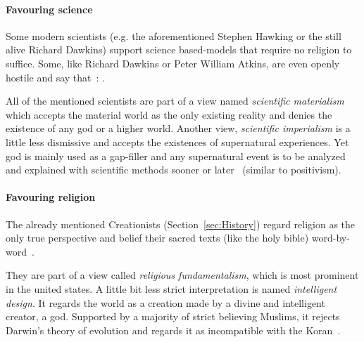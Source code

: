 
\paragraph{Favouring science}
Some modern scientists (e.g. the aforementioned Stephen Hawking or the still alive Richard Dawkins) support science based-models that require no religion to suffice.
Some, like Richard Dawkins or Peter William Atkins, are even openly hostile and say that~\cite{dawkins2006god}: .

All of the mentioned scientists are part of a view named \emph{scientific materialism} which accepts the material world as the only existing reality and denies the existence of any god or a higher world.
Another view, \emph{scientific imperialism} is a little less dismissive and accepts the existences of supernatural experiences.
Yet god is mainly used as a gap-filler and any supernatural event is to be analyzed and explained with scientific methods sooner or later~\cite{krishna1971gopi} (similar to positivism). %



\paragraph{Favouring religion}
The already mentioned Creationists (Section~\ref{sec:History}) regard religion as the only true perspective and belief their sacred texts (like the holy bible) word-by-word~\cite{Hameed1637}.

They are part of a view called \emph{religious fundamentalism}, which is most prominent in the united states.
A little bit less strict interpretation is named \emph{intelligent design}. It regards the world as a creation made by a divine and intelligent creator, a god.
Supported by a majority of strict believing Muslims, it rejects Darwin's theory of evolution and regards it as incompatible with the Koran~\cite{Demirci2016}.



